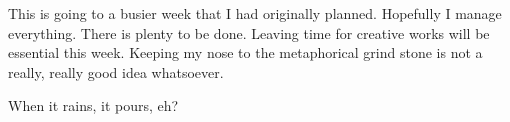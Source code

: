 This is going to a busier week that I had originally planned. Hopefully
I manage everything. There is plenty to be done. Leaving time for
creative works will be essential this week. Keeping my nose to the
metaphorical grind stone is not a really, really good idea whatsoever.

When it rains, it pours, eh?
